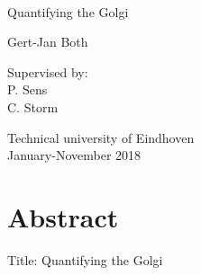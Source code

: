 \documentclass[12pt,a4paper,]{Dissertate}
\date{}
\begin{document}
\begin{titlepage}
​    \begin{center}

        
        \vspace*{2.5cm}
        
        \huge
        Quantifying the Golgi
        
        \vspace{1.5cm}
        
        \Large
        Gert-Jan Both
    
        \vspace{1.5cm}
    
        
        \vfill
        
        \normalsize
        Supervised by:\\
        P. Sens\\
        C. Storm
    
        \vspace{0.8cm}
    
        
        \normalsize
        Technical university of Eindhoven\\
        January-November 2018
    
    
    \end{center}
\end{titlepage}

\hypertarget{abstract}{%
\chapter*{Abstract}\label{abstract}}

Title: Quantifying the Golgi
\end{document}

